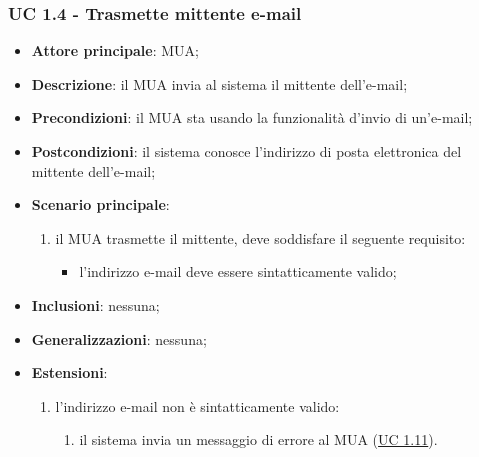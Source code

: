     \subsubsection{UC 1.4 - Trasmette mittente e-mail} \label{sec:UC1.4}
    \begin{itemize}
        \item \textbf{Attore principale}: MUA;
        \item \textbf{Descrizione}: il MUA invia al sistema il mittente dell'e-mail;
        \item \textbf{Precondizioni}: il MUA sta usando la funzionalità d'invio di un'e-mail;
        \item \textbf{Postcondizioni}: il sistema conosce l'indirizzo di posta elettronica del mittente dell'e-mail;
        \item \textbf{Scenario principale}:
            \begin{enumerate}
                \item il MUA trasmette il mittente, deve soddisfare il seguente requisito:
                    \begin{itemize}
                        \item l'indirizzo e-mail deve essere sintatticamente valido;
                    \end{itemize}
            \end{enumerate}
        \item \textbf{Inclusioni}: nessuna;
        \item \textbf{Generalizzazioni}: nessuna;
        \item \textbf{Estensioni}:
            \begin{enumerate}[label=\alph*.]
                \item l'indirizzo e-mail non è sintatticamente valido:
                \begin{enumerate}[label=\arabic*.]
                    \item il sistema invia un messaggio di errore al MUA (\hyperref[sec:UC1.11]{UC 1.11}).
                \end{enumerate}
            \end{enumerate}
    \end{itemize}

